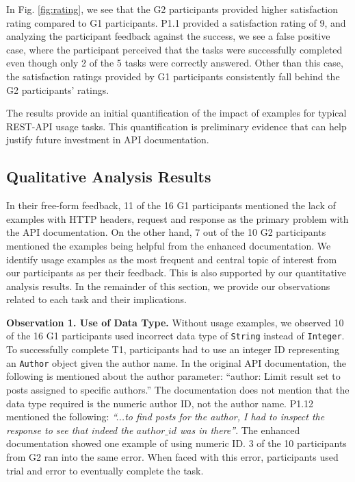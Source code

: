 \documentclass[conference]{IEEEtran}
\begin{document}
In Fig. \ref{fig:rating}, we see that the G2 participants provided higher satisfaction rating compared to G1 participants. P1.1 provided a satisfaction rating of 9, and analyzing the participant feedback against the success, we see a false positive case, where the participant perceived that the tasks were successfully completed even though only 2 of the 5 tasks were correctly answered. Other than this case, the satisfaction ratings provided by G1 participants consistently fall behind the G2 participants' ratings.

The results provide an initial quantification of the impact of examples for typical REST-API usage tasks. This quantification is preliminary evidence that can help justify future investment in API documentation.


\subsection{Qualitative Analysis Results} %

In their free-form feedback, 11 of the 16 G1 participants mentioned the lack of examples with HTTP headers, request and response as the primary problem with the API documentation. On the other hand, 7 out of the 10 G2 participants mentioned the examples being helpful from the enhanced documentation. We identify usage examples as the most frequent and central topic of interest from our participants as per their feedback. This is also supported by our quantitative analysis results. In the remainder of this section, we provide our observations related to each task and their implications.


\textbf{Observation 1. Use of Data Type.} Without usage examples, we observed 10 of the 16 G1 participants used incorrect data type of \lstinline{String} instead of \lstinline{Integer}. To successfully complete T1, participants had to use an integer ID representing an \lstinline{Author} object given the author name. In the original API documentation, the following is mentioned about the author parameter: ``author: Limit result set to posts assigned to specific authors.'' The documentation does not mention that the data type required is the numeric author ID, not the author name. P1.12 mentioned the following: \textit{``...to find posts for the author, I had to inspect the response to see that indeed the $author\_id$ was in there''}. The enhanced documentation showed one example of using numeric ID. 3 of the 10 participants from G2 ran into the same error. When faced with this error, participants used trial and error to eventually complete the task.
\end{document}
